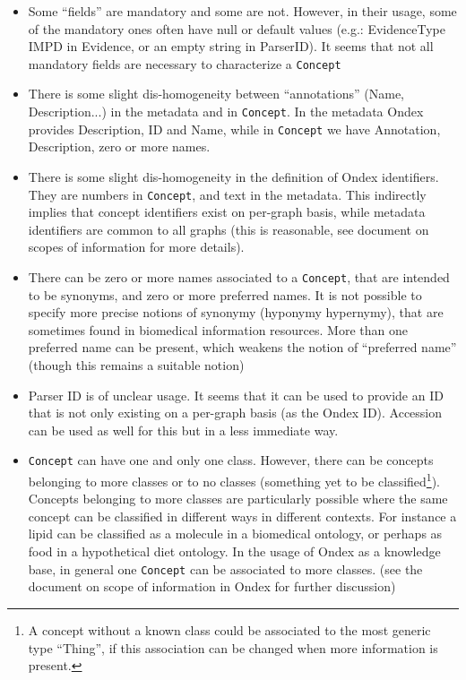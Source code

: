 \documentclass[a4paper,10pt]{article}
\newcommand{\term}[1]{\texttt{#1}\xspace}
\newcommand{\co}{\term{Concept}}
\begin{document}
\begin{itemize}
\item{Some ``fields'' are mandatory and some are not. However, in their usage, some of the mandatory ones often have null or default values (e.g.: EvidenceType IMPD in Evidence, or an empty string in ParserID). It seems that not all mandatory fields are necessary to characterize a \co}

\item{There is some slight dis-homogeneity between ``annotations'' (Name, Description...) in the metadata and in \co. In the metadata Ondex provides Description, ID and Name, while in \co we have Annotation, Description, zero or more names.}

\item{There is some slight dis-homogeneity in the definition of Ondex identifiers. They are numbers in \co, and text in the metadata. This indirectly implies that concept identifiers  exist on per-graph basis, while metadata identifiers are common to all graphs (this is reasonable, see document on scopes of information for more details).}

\item{There can be zero or more names associated to a \co, that are intended to be synonyms, and zero or more preferred names. It is not possible to specify more precise notions of synonymy (hyponymy hypernymy), that are sometimes found in biomedical information resources. More than one preferred name can be present, which weakens the notion of ``preferred name'' (though this remains a suitable notion) }

\item{Parser ID is of unclear usage. It seems that it can be used to provide an ID that is not only existing on a per-graph basis (as the Ondex ID). Accession can be used as well for this but in a less immediate way. }

\item{\co can have one and only one class. However, there can be concepts belonging to more classes or to no classes (something yet to be classified\footnote{A concept without a known class could be associated to the most generic type ``Thing'', if this association can be changed when more information is present.}). Concepts belonging to more classes are particularly possible where the same concept can be classified in different ways in different contexts. For instance a lipid can be classified as a molecule in a biomedical ontology, or perhaps as food in a hypothetical diet ontology. In the usage of Ondex as a knowledge base, in general one \co can be associated to more classes. (see the document on scope of information in Ondex for further discussion)  }
\end{itemize}
\end{document}
